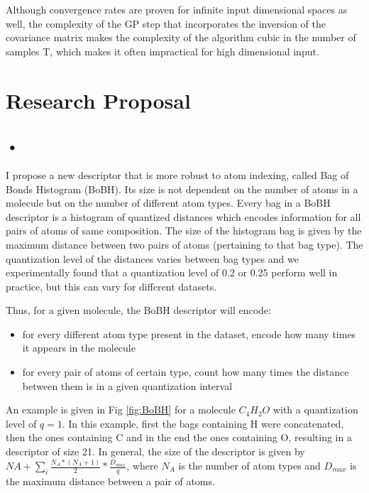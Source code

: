 \documentclass[10pt,journal,a4paper]{IEEEtran}
\begin{document}
Although convergence rates are proven for infinite input dimensional spaces as well, the complexity of the GP step that incorporates the inversion of the covariance matrix makes the complexity of the algorithm cubic in the number of samples T, which makes it often impractical for high dimensional input.

\section{Research Proposal}
\subsection*{•}
I propose a new descriptor that is more robust to atom indexing, called Bag of Bonds Histogram (BoBH). Its size is not dependent on the number of atoms in a molecule but on the number of different atom types. Every bag in a BoBH descriptor is a histogram of quantized distances which encodes information for all pairs of atoms of same composition. The size of the histogram bag is given by the maximum distance between two pairs of atoms (pertaining to that bag type). The quantization level of the distances varies between bag types and we experimentally found that a quantization level of 0.2 or 0.25 perform well in practice, but this can vary for different datasets.

Thus, for a given molecule, the BoBH descriptor will encode:
\begin{itemize}
\item 
for every different atom type present in the dataset, encode how many times it appears in the molecule
\item  
for every pair of atoms of certain type, count how many times the distance between them is in a given quantization interval 
\end{itemize}

An example is given in Fig \ref{fig:BoBH} for a molecule $C_{4}H_{2}O$ with a quantization level of $q=1$. In this example, first the bags containing H were concatenated, then the ones containing C and in the end the ones containing O, resulting in a descriptor of size 21. In general, the size of the descriptor is given by $NA + \sum_i \frac{N_A*(N_A+1)}{2} *\frac{D_{max}}{q} $, where $N_A$ is the number of atom types and $D_{max}$ is the maximum distance between a pair of atoms. 
\end{document}
